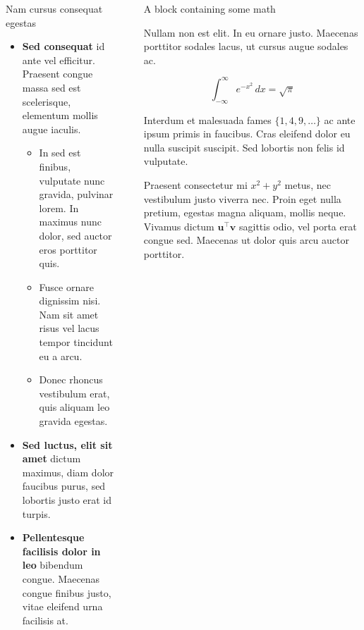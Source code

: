 \documentclass[final]{beamer}
\newlength{\sepwidth}
\newlength{\colwidth}
\newcommand{\separatorcolumn}{\begin{column}{\sepwidth}\end{column}}
\begin{document}
\begin{frame}[t]
\begin{columns}[t]
\begin{column}{\colwidth}
\begin{block}{Nam cursus consequat egestas}
				\begin{itemize}
					\item \textbf{Sed consequat} id ante vel efficitur. Praesent congue massa
					      sed est scelerisque, elementum mollis augue iaculis.
					      \begin{itemize}
						      \item In sed est finibus, vulputate
						            nunc gravida, pulvinar lorem. In maximus nunc dolor, sed auctor eros
						            porttitor quis.
						      \item Fusce ornare dignissim nisi. Nam sit amet risus vel lacus
						            tempor tincidunt eu a arcu.
						      \item Donec rhoncus vestibulum erat, quis aliquam leo
						            gravida egestas.
					      \end{itemize}
					\item \textbf{Sed luctus, elit sit amet} dictum maximus, diam dolor
					      faucibus purus, sed lobortis justo erat id turpis.
					\item \textbf{Pellentesque facilisis dolor in leo} bibendum congue.
					      Maecenas congue finibus justo, vitae eleifend urna facilisis at.
				\end{itemize}

			\end{block}

		\end{column}

		\separatorcolumn

		\begin{column}{\colwidth}

			\begin{block}{A block containing some math}

				Nullam non est elit. In eu ornare justo. Maecenas porttitor sodales lacus,
				ut cursus augue sodales ac.

				$$
					\int_{-\infty}^{\infty} e^{-x^2}\,dx = \sqrt{\pi}
				$$

				Interdum et malesuada fames $\{1, 4, 9, \ldots\}$ ac ante ipsum primis in
				faucibus. Cras eleifend dolor eu nulla suscipit suscipit. Sed lobortis non
				felis id vulputate.

				\heading{A heading inside a block}

				Praesent consectetur mi $x^2 + y^2$ metus, nec vestibulum justo viverra
				nec. Proin eget nulla pretium, egestas magna aliquam, mollis neque. Vivamus
				dictum $\mathbf{u}^\intercal\mathbf{v}$ sagittis odio, vel porta erat
				congue sed. Maecenas ut dolor quis arcu auctor porttitor.


\end{block}
\end{column}
\end{columns}
\end{frame}
\end{document}
